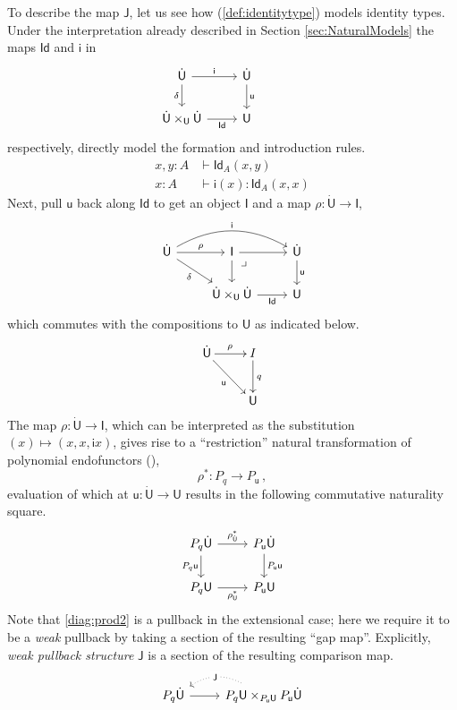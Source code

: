 \documentclass[12pt,reqno]{amsart}
\renewcommand{\to}{\ensuremath{\rightarrow}}
\newcommand{\Id}{\mathsf{Id}}
\renewcommand{\t}{\ensuremath{\mathsf{u}}}
\newcommand{\T}{\ensuremath{\mathsf{U}}}
\newcommand{\TT}{\ensuremath{\dot{\mathsf{U}}}}
\newcommand{\pbcorner}{\arrow[dr,phantom,"\lrcorner" very near start, shift right=.5ex]} %
\theoremstyle{remark}
\theoremstyle{definition}
\begin{document}
To describe the map $\mathsf{J}$, let us see how (\ref{def:identitytype}) models identity types.  Under the interpretation already described in Section \ref{sec:NaturalModels} the maps $\Id$ and $\mathsf{i}$  in 
\begin{equation*}%
\begin{tikzcd}
	\TT \ar[r,"\mathsf{i}"] \ar[d,swap,"\delta"] &  \TT \ar[d, "\t"]\\  
	\TT \times_\T \TT \ar[r, swap,"\mathsf{Id}"] & \T
 \end{tikzcd}\qquad \qquad 
 \end{equation*}
respectively, directly model the formation and introduction rules.
\begin{align*}
x, y:A &\vdash \Id_A(x, y)\\
x: A &\vdash \mathsf{i}(x) : \Id_A(x, x)
\end{align*}
Next, pull $\t$ back along $\mathsf{Id}$ to get an object $\mathsf{I}$ and a map $\rho  : \TT \to \mathsf{I}$,
%
\begin{equation*}%
\begin{tikzcd}
\TT \ar[rd,swap,"{\delta}"] \ar[r,"{\rho}"] \ar[rr, bend left,"{\mathsf{i}}"] & \mathsf{I} \ar[r]  \ar[d] \pbcorner &  \TT \ar[d, "\t"]\\
& \TT \times_\T \TT  \ar[r, swap,"{\mathsf{Id}}"]  & \T
\end{tikzcd}
\end{equation*}
%
which commutes with the compositions to $\T$ as indicated below.
%
\begin{equation*}%
\xymatrix{
\TT \ar[rd]_{\t} \ar[r]^{\rho} & I \ar[d]^{q}  \\
& \T 
}
\end{equation*}
%
The map $\rho  : \TT \to \mathsf{I}$, which can be interpreted as the substitution $(x) \mapsto (x, x, \mathsf{i}x)$, gives rise to a ``restriction'' natural transformation of polynomial endofunctors (\cite{GambinoKoch:2013}),
\[
\rho^* : P_q \to P_\t\,,
\]
evaluation of which at $\t:\TT \to\T$ results in the following commutative naturality square.
\begin{equation}\label{diag:prod2}
\begin{tikzcd}
P_q\TT \ar[d,swap, "{P_q \t}"] \ar[r, "{\rho^{*}_{\TT}}"] & P_\t\TT \ar[d, "{P_\t \t}"] \\
P_q\T \ar[r,swap, "{\rho^{*}_{\T}}"] &  P_\t\T 
\end{tikzcd}
\end{equation}
%
Note that \eqref{diag:prod2} is a pullback in the extensional case; here we require it to be a \emph{weak} pullback by taking a section of the resulting ``gap map''.   Explicitly, \emph{weak pullback structure} $\mathsf{J}$ is a section of the resulting comparison map.
\begin{equation}\label{def:wps}
\begin{tikzcd}
P_q \TT  \ar[r] & \ar[l, bend right, dotted, "\mathsf{J}" description] P_q\T \times_{P_\t\T} P_\t\TT 
\end{tikzcd}
\end{equation}
\end{document}
